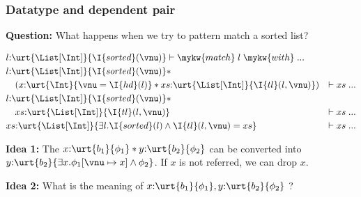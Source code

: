 \begin{frame}[fragile]
    \frametitle{Datatype and dependent pair}

    \textbf{Question:} What happens when we try to pattern match a sorted list?

    \begin{align*}
        &l{:}\urt{\List[\Int]}{\I{sorted}(\vnu)} \vdash \mykw{match}\; l\; \mykw{with} \; ...
        \\&l{:}\urt{\List[\Int]}{\I{sorted}(\vnu)} * 
        \\&\quad (x{:}\urt{\Int}{\vnu = \I{hd}(l)} * xs{:}\urt{\List[\Int]}{\I{tl}(l,\vnu)}) &\vdash xs \; ...
        \\&l{:}\urt{\List[\Int]}{\I{sorted}(\vnu)} * 
        \\&\quad xs{:}\urt{\List[\Int]}{\I{tl}(l,\vnu)} &\vdash xs \; ...
        \\&xs{:}\urt{\List[\Int]}{\exists l. \I{sorted}(l) \land \I{tl}(l,\vnu) = xs} &\vdash xs \; ...
    \end{align*}\noindent

    \textbf{Idea 1:} The $x{:}\urt{b_1}{\phi_1} * y{:}\urt{b_2}{\phi_2}$ can be converted into $y{:}\urt{b_2}{\exists x. \phi_1[\vnu \mapsto x] \land \phi_2}$. If $x$ is not referred, we can drop $x$.

    \textbf{Idea 2:} What is the meaning of $x{:}\urt{b_1}{\phi_1}, y{:}\urt{b_2}{\phi_2}$ ?

\end{frame}








